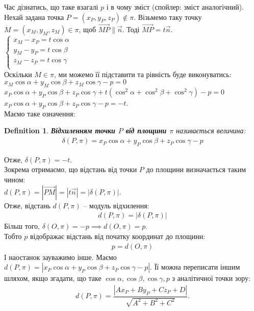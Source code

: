 \documentclass[a4paper, 10pt]{extarticle}
\theoremstyle{theoremdd}
\theoremstyle{theoremdd}
\newtheorem{definition}[theorem]{Definition}
\theoremstyle{theoremdd}
\theoremstyle{theoremdd}
\theoremstyle{theoremdd}
\theoremstyle{theoremdd}
\theoremstyle{theoremdd}
\theoremstyle{theoremdd}
\begin{document}
Час дізнатись, що таке взагалі $p$ і в чому зміст (спойлер: зміст аналогічний).\\
Нехай задана точка $P = (x_P, y_P, z_P) \not \in \pi$. Візьмемо таку точку $M = (x_M, y_M, z_M) \in \pi$, щоб $\overrightarrow{MP} \parallel \vec{n}$. Тоді $\overrightarrow{MP} = t \vec{n}$.\\
$\begin{cases}
x_M - x_P = t \cos \alpha\\
y_M - y_P = t \cos \beta\\
z_M - z_P = t \cos \gamma\\
\end{cases}
$\\
Оскільки $M \in \pi$, ми можемо її підставити та рівність буде виконуватись:\\
$x_M \cos \alpha + y_M \cos \beta + z_M \cos \gamma - p = 0$\\
$x_P \cos \alpha + y_P \cos \beta + z_P \cos \gamma + t(\cos^2 \alpha + \cos^2 \beta + \cos^2 \gamma) - p = 0$\\
$x_P \cos \alpha + y_P \cos \beta + z_P \cos \gamma -p = -t$.\\
Маємо таке означення:
\begin{definition}
\textbf{Відхиленням точки $P$ від площини $\pi$} називається величина:
\begin{align*}
\delta(P,\pi) = x_P \cos \alpha + y_P \cos \beta + z_P \cos \gamma - p
\end{align*}
\end{definition}
Отже, $\delta(P,\pi)=-t$.\\
Зокрема отримаємо, що відстань від точки $P$ до площини визначається таким чином:\\
$d(P,\pi)=|\overrightarrow{PM}| = |t \vec{n}| = |\delta(P,\pi)|$.\\
Отже, відстань $d(P,\pi)$ -- модуль відхилення:
\begin{align*}
d(P,\pi) = |\delta(P,\pi)|
\end{align*}
Більш того, $\delta(O,\pi) = -p \implies d(O,\pi) = p$.\\
Тобто $p$ відображає відстань від початку координат до площини:
\begin{align*}
p = d(O,\pi)
\end{align*}
І наостанок зауважимо інше. Маємо $d(P,\pi) = |x_P \cos \alpha + y_P \cos \beta + z_P \cos \gamma - p|$. Її можна переписати іншим шляхом, якщо згадати, що таке $\cos \alpha, \cos \beta, \cos \gamma, p$ з аналітичної точки зору:
\begin{align*}
d(P,\pi) = \dfrac{|Ax_P + By_P + Cz_P + D|}{\sqrt{A^2+B^2+C^2}}.
\end{align*}
\end{document}
